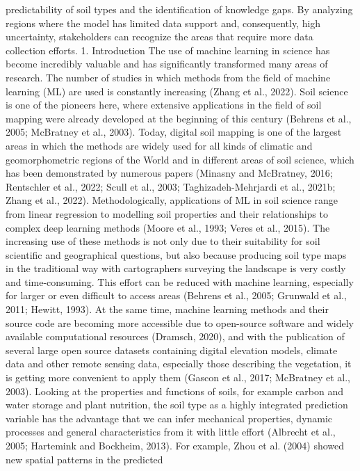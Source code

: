 predictability of soil types and the identification of knowledge gaps. By analyzing regions where the model has
limited data support and, consequently, high uncertainty, stakeholders can recognize the areas that require more
data collection efforts.
1. Introduction
The use of machine learning in science has become incredibly
valuable and has significantly transformed many areas of research. The
number of studies in which methods from the field of machine learning
(ML) are used is constantly increasing (Zhang et al., 2022). Soil science
is one of the pioneers here, where extensive applications in the field of
soil mapping were already developed at the beginning of this century
(Behrens et al., 2005; McBratney et al., 2003). Today, digital soil mapping
is one of the largest areas in which the methods are widely used for
all kinds of climatic and geomorphometric regions of the World and in
different areas of soil science, which has been demonstrated by
numerous papers (Minasny and McBratney, 2016; Rentschler et al.,
2022; Scull et al., 2003; Taghizadeh-Mehrjardi et al., 2021b; Zhang
et al., 2022). Methodologically, applications of ML in soil science range
from linear regression to modelling soil properties and their relationships
to complex deep learning methods (Moore et al., 1993; Veres et al.,
2015). The increasing use of these methods is not only due to their
suitability for soil scientific and geographical questions, but also because
producing soil type maps in the traditional way with cartographers
surveying the landscape is very costly and time-consuming. This effort
can be reduced with machine learning, especially for larger or even
difficult to access areas (Behrens et al., 2005; Grunwald et al., 2011;
Hewitt, 1993). At the same time, machine learning methods and their
source code are becoming more accessible due to open-source software
and widely available computational resources (Dramsch, 2020), and
with the publication of several large open source datasets containing
digital elevation models, climate data and other remote sensing data,
especially those describing the vegetation, it is getting more convenient
to apply them (Gascon et al., 2017; McBratney et al., 2003).
Looking at the properties and functions of soils, for example carbon
and water storage and plant nutrition, the soil type as a highly integrated
prediction variable has the advantage that we can infer mechanical
properties, dynamic processes and general characteristics from it with
little effort (Albrecht et al., 2005; Hartemink and Bockheim, 2013). For
example, Zhou et al. (2004) showed new spatial patterns in the predicted
